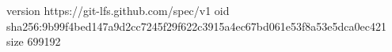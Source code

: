 version https://git-lfs.github.com/spec/v1
oid sha256:9b99f4bed147a9d2cc7245f29f622c3915a4ec67bd061e53f8a53e5dca0ec421
size 699192
